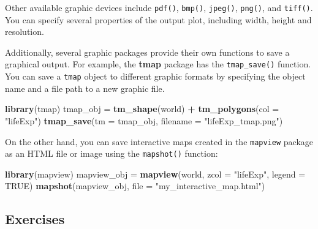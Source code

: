 \documentclass[]{krantz}
\newenvironment{Shaded}{\begin{snugshade}}{\end{snugshade}}
\newcommand{\DataTypeTok}[1]{\textcolor[rgb]{0.27,0.27,0.27}{#1}}
\newcommand{\KeywordTok}[1]{\textcolor[rgb]{0.27,0.27,0.27}{\textbf{#1}}}
\newcommand{\NormalTok}[1]{#1}
\newcommand{\OperatorTok}[1]{\textcolor[rgb]{0.43,0.43,0.43}{\textbf{#1}}}
\newcommand{\OtherTok}[1]{\textcolor[rgb]{0.37,0.37,0.37}{#1}}
\newcommand{\StringTok}[1]{\textcolor[rgb]{0.5,0.5,0.5}{#1}}
\begin{document}
Other available graphic devices include \texttt{pdf()}, \texttt{bmp()}, \texttt{jpeg()}, \texttt{png()}, and \texttt{tiff()}.
You can specify several properties of the output plot, including width, height and resolution.

Additionally, several graphic packages provide their own functions to save a graphical output.
For example, the \textbf{tmap} package has the \texttt{tmap\_save()} function.
You can save a \texttt{tmap} object to different graphic formats by specifying the object name and a file path to a new graphic file.

\begin{Shaded}
\begin{Highlighting}[]
\KeywordTok{library}\NormalTok{(tmap)}
\NormalTok{tmap_obj =}\StringTok{ }\KeywordTok{tm_shape}\NormalTok{(world) }\OperatorTok{+}
\StringTok{  }\KeywordTok{tm_polygons}\NormalTok{(}\DataTypeTok{col =} \StringTok{"lifeExp"}\NormalTok{)}
\KeywordTok{tmap_save}\NormalTok{(}\DataTypeTok{tm  =}\NormalTok{ tmap_obj, }\DataTypeTok{filename =} \StringTok{"lifeExp_tmap.png"}\NormalTok{)}
\end{Highlighting}
\end{Shaded}

On the other hand, you can save interactive maps created in the \texttt{mapview} package as an HTML file or image using the \texttt{mapshot()} function:

\begin{Shaded}
\begin{Highlighting}[]
\KeywordTok{library}\NormalTok{(mapview)}
\NormalTok{mapview_obj =}\StringTok{ }\KeywordTok{mapview}\NormalTok{(world, }\DataTypeTok{zcol =} \StringTok{"lifeExp"}\NormalTok{, }\DataTypeTok{legend =} \OtherTok{TRUE}\NormalTok{)}
\KeywordTok{mapshot}\NormalTok{(mapview_obj, }\DataTypeTok{file =} \StringTok{"my_interactive_map.html"}\NormalTok{)}
\end{Highlighting}
\end{Shaded}

\hypertarget{exercises-5}{%
\subsection{Exercises}\label{exercises-5}}
\end{document}

